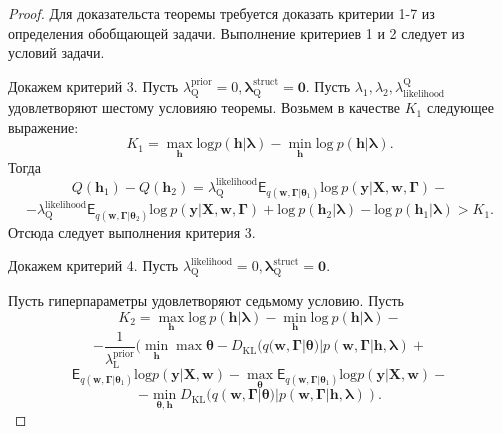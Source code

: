 \begin{proof}
Для доказательста теоремы требуется доказать критерии 1-7 из определения обобщающей задачи.
Выполнение критериев 1 и 2 следует из условий задачи.

Докажем критерий 3. 
Пусть $\lambda^{\text{prior}}_\text{Q} = 0, \boldsymbol{\lambda}^\text{struct}_\text{Q} = \mathbf{0}$. 
Пусть $\lambda_1, \lambda_2, \lambda_\text{likelihood}^\text{Q}$ удовлетворяют шестому условияю теоремы.
Возьмем в качестве $K_1$ следующее выражение:
\[
    K_1= \max_{\mathbf{h}} \text{log} p (\mathbf{h}|\boldsymbol{\lambda})-\min_{\mathbf{h}} \text{log}~p(\mathbf{h}|\boldsymbol{\lambda}).
\]
Тогда 
\[
Q(\mathbf{h}_1)-Q(\mathbf{h}_2) = \lambda^\text{likelihood}_\text{Q} \mathsf{E}_{q(\mathbf{w}, \boldsymbol{\Gamma}|\boldsymbol{\theta}_1)} \text{log}~p(\mathbf{y}|\mathbf{X}, \mathbf{w}, \boldsymbol{\Gamma})-\]
\[
-\lambda^\text{likelihood}_\text{Q}  \mathsf{E}_{q(\mathbf{w}, \boldsymbol{\Gamma}|\boldsymbol{\theta}_2)} \text{log}~p(\mathbf{y}|\mathbf{X}, \mathbf{w}, \boldsymbol{\Gamma})
+\text{log}~p(\mathbf{h}_2|\boldsymbol{\lambda})-\text{log}~p(\mathbf{h}_1|\boldsymbol{\lambda})>K_1.
\]
Отсюда следует выполнения критерия 3.

Докажем критерий 4. 
Пусть $\lambda^{\text{likelihood}}_\text{Q} = 0, \boldsymbol{\lambda}^\text{struct}_\text{Q} = \mathbf{0}$. 

Пусть гиперпараметры удовлетворяют седьмому условию.
Пусть 
\[
K_2 =  \max_{\mathbf{h}} \text{log}~p (\mathbf{h}|\boldsymbol{\lambda}) - \min_{\mathbf{h}} \text{log}~p (\mathbf{h}|\boldsymbol{\lambda}) -
\]
\[
-\frac{1}{\lambda^\text{prior}_\text{L}}\bigl(\min_{\mathbf{h}}\max{\boldsymbol{\theta}} -D_\text{KL}(q(\mathbf{w}, \boldsymbol{\Gamma}|\boldsymbol{\theta})|p(\mathbf{w}, \boldsymbol{\Gamma}|\mathbf{h}, \boldsymbol{\lambda})+
\]
\[
\mathsf{E}_{q(\mathbf{w}, \boldsymbol{\Gamma}|\boldsymbol{\theta}_1)}\text{log}p(\mathbf{y}|\mathbf{X}, \mathbf{w})  - \max_{\boldsymbol{\theta}} \mathsf{E}_{q(\mathbf{w}, \boldsymbol{\Gamma}|\boldsymbol{\theta}_1)}\text{log}p(\mathbf{y}|\mathbf{X}, \mathbf{w}) - 
\]
\[
-\min_{\boldsymbol{\theta}, \mathbf{h}} D_\text{KL}(q(\mathbf{w}, \boldsymbol{\Gamma}|\boldsymbol{\theta})|p(\mathbf{w}, \boldsymbol{\Gamma}|\mathbf{h}, \boldsymbol{\lambda})) .
\]


\end{proof}
